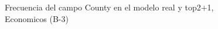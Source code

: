 \begin{figure}[H]
    \centering
    
    \caption{Frecuencia del campo County en el modelo real y top2+1, Economicos (B-3)}
    \label{frecuency-County-top2+1}
\end{figure}